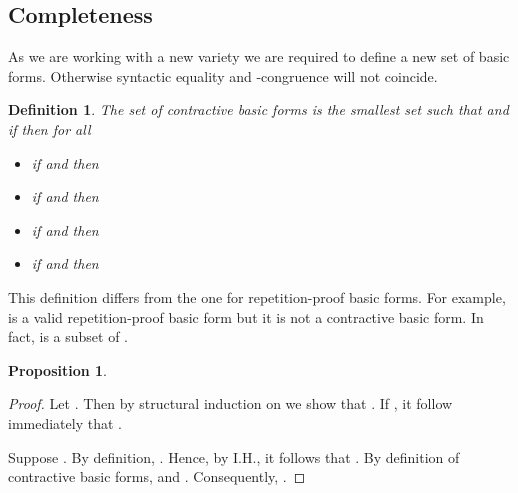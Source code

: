 \documentclass[a4paper,twoside,openright]{report}
\newtheorem{prop}[theorem]{Proposition}
\newtheorem{defn}[theorem]{Definition}
\begin{document}
\subsection{Completeness}
As we are working with a new variety we are required to define a new set of basic forms. Otherwise syntactic equality and -congruence will not coincide.
\begin{defn}
The set of contractive basic forms is the smallest set  such that  and if  then for all 
\begin{itemize}
\item if  and  then 
\item if  and  then 
\item if  and  then 
\item if  and  then 
\end{itemize}
\end{defn}
This definition differs from the one for repetition-proof basic forms. For example,  is a valid repetition-proof basic form but it is not a contractive basic form. In fact,  is a subset of .
\begin{prop}

\end{prop}
\begin{proof}
Let . Then by structural induction on  we show that . If , it follow immediately that .

Suppose . By definition, . Hence, by I.H., it follows that . By definition of contractive basic forms,  and . Consequently, .
\end{proof}
\end{document}
